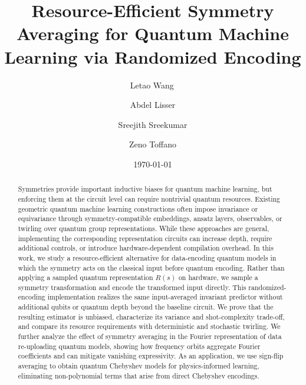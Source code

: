 \documentclass[%
 reprint,
 amsmath,amssymb,
 aps,
 pra,
]{revtex4-2}
\theoremstyle{definition}
\begin{document}

\title{Resource-Efficient Symmetry Averaging for Quantum Machine Learning via Randomized Encoding}

\author{Letao Wang\,}

\author{Abdel Lisser}

\author{Sreejith Sreekumar}

\author{Zeno Toffano}

\date{\today}

\begin{abstract}
Symmetries provide important inductive biases for quantum machine learning, but enforcing them at the circuit level can require nontrivial quantum resources. Existing geometric quantum machine learning constructions often impose invariance or equivariance through symmetry-compatible embeddings, ansatz layers, observables, or twirling over quantum group representations. While these approaches are general, implementing the corresponding representation circuits can increase depth, require additional controls, or introduce hardware-dependent compilation overhead. In this work, we study a resource-efficient alternative for data-encoding quantum models in which the symmetry acts on the classical input before quantum encoding. Rather than applying a sampled quantum representation \(R(s)\) on hardware, we sample a symmetry transformation and encode the transformed input directly. This randomized-encoding implementation realizes the same input-averaged invariant predictor without additional qubits or quantum depth beyond the baseline circuit. We prove that the resulting estimator is unbiased, characterize its variance and shot-complexity trade-off, and compare its resource requirements with deterministic and stochastic twirling. We further analyze the effect of symmetry averaging in the Fourier representation of data re-uploading quantum models, showing how frequency orbits aggregate Fourier coefficients and can mitigate vanishing expressivity. As an application, we use sign-flip averaging to obtain quantum Chebyshev models for physics-informed learning, eliminating non-polynomial terms that arise from direct Chebyshev encodings.
\end{abstract}
\end{document}
